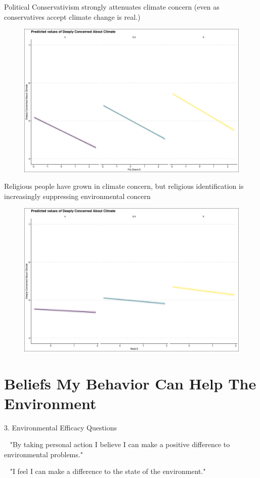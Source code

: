 \documentclass{beamer}
\begin{document}
\begin{frame}{Political Conservativism strongly attenuates climate concern (even as conservatives accept climate change is real.)}
\begin{figure}
\includegraphics[width=.8\textwidth,height=\textheight,keepaspectratio]{Figures/CONCERN_Pol.Orient.S.png}
\end{figure}
\end{frame}


\begin{frame}{Religious people have grown in climate concern, but religious identification is increasingly suppressing environmental concern}
\begin{figure}
\includegraphics[width=.8\textwidth,height=\textheight,keepaspectratio]{Figures/CONCERN_RELIDS_T.png}
\end{figure}
\end{frame}


\section{Beliefs My Behavior Can Help The Environment}
\begin{frame}{3. Environmental Efficacy Questions}
    

\begin{alertblock}{~}
"By taking personal action I believe I can make a positive difference to environmental problems."
\end{alertblock}

\begin{alertblock}{~}
"I feel I can make a difference to the state of the environment."
\end{alertblock}

\end{frame}
\end{document}

